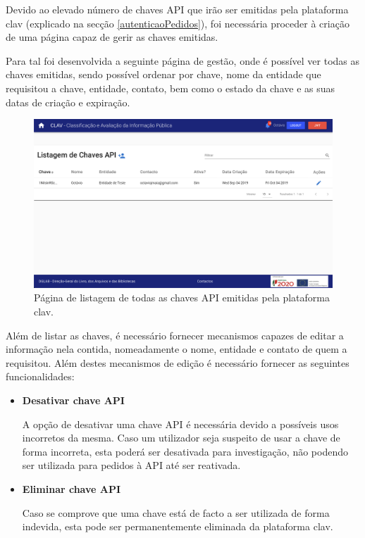 Devido ao elevado número de chaves API que irão ser emitidas pela plataforma \gls{clav} (explicado na secção \ref{autenticaoPedidos}), foi necessária proceder à criação de uma página capaz de gerir as chaves emitidas.

Para tal foi desenvolvida a seguinte página de gestão, onde é possível ver todas as chaves emitidas, sendo possível ordenar por chave, nome da entidade que requisitou a chave, entidade, contato, bem como o estado da chave e as suas datas de criação e expiração.

\begin{figure}[H]
    \centering
    \includegraphics[width=\textwidth]{img/clav/gestaoAPI/listagemChaves.png}
    \caption{Página de listagem de todas as chaves API emitidas pela plataforma \gls{clav}.}
    \label{fig:listagemChavesAPI}
\end{figure}

Além de listar as chaves, é necessário fornecer mecanismos capazes de editar a informação nela contida, nomeadamente o nome, entidade e contato de quem a requisitou. Além destes mecanismos de edição é necessário fornecer as seguintes funcionalidades:

\begin{itemize}
    \item \textbf{Desativar chave API}
    
    A opção de desativar uma chave API é necessária devido a possíveis usos incorretos da mesma. Caso um utilizador seja suspeito de usar a chave de forma incorreta, esta poderá ser desativada para investigação, não podendo ser utilizada para pedidos à API até ser reativada.
    
    \item \textbf{Eliminar chave API}
    
    Caso se comprove que uma chave está de facto a ser utilizada de forma indevida, esta pode ser permanentemente eliminada da plataforma \gls{clav}.
\end{itemize}

